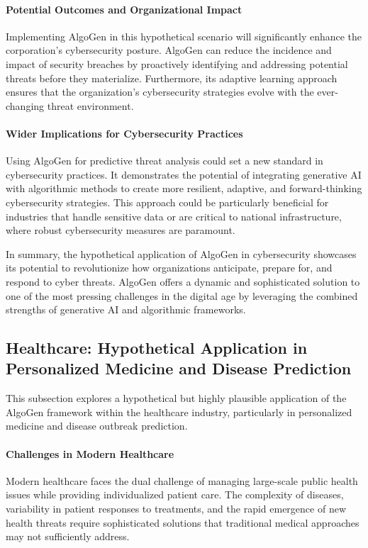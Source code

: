 \documentclass{article}
\begin{document}
\paragraph{Potential Outcomes and Organizational Impact}
Implementing AlgoGen in this hypothetical scenario will significantly enhance the corporation’s cybersecurity posture. AlgoGen can reduce the incidence and impact of security breaches by proactively identifying and addressing potential threats before they materialize. Furthermore, its adaptive learning approach ensures that the organization's cybersecurity strategies evolve with the ever-changing threat environment.

\paragraph{Wider Implications for Cybersecurity Practices}
Using AlgoGen for predictive threat analysis could set a new standard in cybersecurity practices. It demonstrates the potential of integrating generative AI with algorithmic methods to create more resilient, adaptive, and forward-thinking cybersecurity strategies. This approach could be particularly beneficial for industries that handle sensitive data or are critical to national infrastructure, where robust cybersecurity measures are paramount.

In summary, the hypothetical application of AlgoGen in cybersecurity showcases its potential to revolutionize how organizations anticipate, prepare for, and respond to cyber threats. AlgoGen offers a dynamic and sophisticated solution to one of the most pressing challenges in the digital age by leveraging the combined strengths of generative AI and algorithmic frameworks.





\subsection{Healthcare: Hypothetical Application in Personalized Medicine and Disease Prediction}
This subsection explores a hypothetical but highly plausible application of the AlgoGen framework within the healthcare industry, particularly in personalized medicine and disease outbreak prediction.

\paragraph{Challenges in Modern Healthcare}
Modern healthcare faces the dual challenge of managing large-scale public health issues while providing individualized patient care. The complexity of diseases, variability in patient responses to treatments, and the rapid emergence of new health threats require sophisticated solutions that traditional medical approaches may not sufficiently address.
\end{document}
